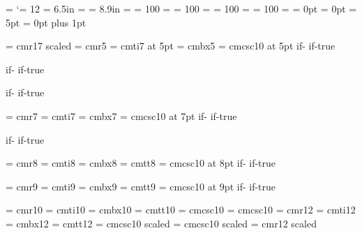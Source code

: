 {{{{            \hfil
            \@RightRunningHead
            \hskip 18pt
        }%
    \else
        \headline = {%
            \small\rm
            \hskip 18pt
            \@LeftRunningHead
            \hfil
        }%
    \fi
}
\catcode`\@ = 12
\def\SetUpTeXIPValues #1#2#3#4#5#6#7#8#9{%
    \HsizeTeXIP = #1\relax
    \hsize = \HsizeTeXIP
    \VsizeTeXIP = #2\relax
    \vsize = \VsizeTeXIP
    \SetParIndent{20pt}
    \ClubPenalty = #4\relax
    \clubpenalty = \ClubPenalty
    \WidowPenalty = #5\relax
    \widowpenalty = \WidowPenalty
    \InterlinePenalty = #6\relax
    \interlinepenalty = \InterlinePenalty
    \BrokenPenalty = #7\relax
    \brokenpenalty = \BrokenPenalty
    \OddPagesHorizontalShift = 0pt
    \EvenPagesHorizontalShift = 0pt
    \overfullrule = #8\relax
    \parskip = #9\relax
}
\SetUpTeXIPValues{6.5in}{8.9in}{20pt}{100}{100}{100}{100}%
    {5pt}{0pt plus 1pt}
\def\SubstituteFont #1#2#3#4{%
    \expandafter\newifOF \csname if-\string#1\endcsname
    \csname if-\string#1true\endcsname
    \def#1{%
        \csname if-\string#1\endcsname
            \message{%
                \string\SubstituteFont: No \string#2 font at
                size #3pt, using \noexpand\rm instead.%
            }%
            \global\csname if-\string#1false\endcsname
        \fi
        #4%
    }%
}
\font\RmLargerThanLife = cmr17 scaled 
\NewFont\Vrm = cmr5
\NewFont\Vit = cmti7 at 5pt
\NewFont\Vbf = cmbx5
\NewFont\Vsc = cmcsc10 at 5pt
\SubstituteFont{\Vtt}{\tt}{7}{\VIIrm}
\SubstituteFont{\Vsc}{\sc}{7}{\VIIrm}
\SubstituteFont{\Vsl}{\sl}{7}{\VIIrm}
\NewFont\VIIrm = cmr7
\NewFont\VIIit = cmti7
\NewFont\VIIbf = cmbx7
\NewFont\VIIsc = cmcsc10 at 7pt
\SubstituteFont{\VIItt}{\tt}{7}{\VIIrm}
\SubstituteFont{\VIIsl}{\sl}{7}{\VIIrm}
\NewFont\VIIIrm = cmr8
\NewFont\VIIIit = cmti8
\NewFont\VIIIbf = cmbx8
\NewFont\VIIItt = cmtt8
\NewFont\VIIIsc = cmcsc10 at 8pt
\SubstituteFont{\VIIIsl}{\sl}{8}{\VIIIrm}
\NewFont\IXrm = cmr9
\NewFont\IXit = cmti9
\NewFont\IXbf = cmbx9
\NewFont\IXtt = cmtt9
\NewFont\IXsc = cmcsc10 at 9pt
\SubstituteFont{\IXsl}{\sl}{9}{\IXrm}
\NewFont\Xrm = cmr10
\NewFont\Xit = cmti10
\NewFont\Xbf = cmbx10
\NewFont\Xtt = cmtt10
\NewFont\Xsc = cmcsc10
\NewFont\Xsl = cmcsc10
\NewFont\XIIrm = cmr12
\NewFont\XIIit = cmti12
\NewFont\XIIbf = cmbx12
\NewFont\XIItt = cmtt12
\NewFont\XIIsc = cmcsc10 scaled 
\NewFont\XIIsl = cmcsc10 scaled 
\NewFont\XIIIrm = cmr12 scaled \magstephalf
}}
